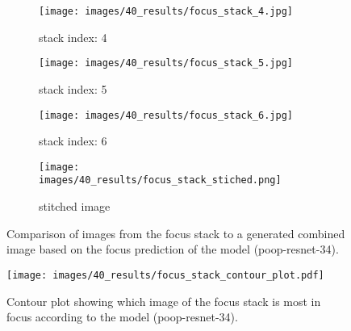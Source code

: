 \begin{figure}
    \centering
    \begin{subfigure}[b]{\textwidth}
        \centering
        \caption{stack index: 4}
        \texttt{[image: images/40\_results/focus\_stack\_4.jpg]}
        \label{fig:Results:Stack:SideBySide:Index0}
    \end{subfigure}
    \begin{subfigure}[b]{\textwidth}
        \centering
        \caption{stack index: 5}
        \texttt{[image: images/40\_results/focus\_stack\_5.jpg]}
        \label{fig:Results:Stack:SideBySide:Index1}
    \end{subfigure}
    \begin{subfigure}[b]{\textwidth}
        \centering
        \caption{stack index: 6}
        \texttt{[image: images/40\_results/focus\_stack\_6.jpg]}
        \label{fig:Results:Stack:SideBySide:Index2}
    \end{subfigure}
    \begin{subfigure}[b]{\textwidth}
        \centering
        \caption{stitched image}
        \texttt{[image: images/40\_results/focus\_stack\_stiched.png]}
        \label{fig:Results:Stack:SideBySide:Stiched}
    \end{subfigure}
    \caption{Comparison of images from the focus stack to a generated combined image based on the focus prediction of the model (\acs{poop}-\acs{resnet}-34).}
    \label{fig:Results:Stack:SideBySide}
\end{figure}

\begin{figure}
    \centering
    \texttt{[image: images/40\_results/focus\_stack\_contour\_plot.pdf]}
    \caption{Contour plot showing which image of the focus stack is most in focus according to the model (\acs{poop}-\acs{resnet}-34).}
    \label{fig:Results:Stack:ContourPlot}
\end{figure}

